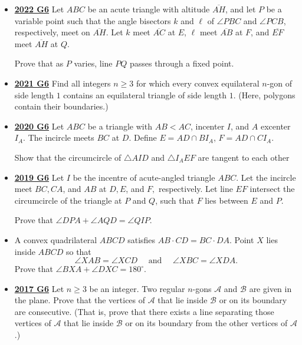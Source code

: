 \documentclass[11pt]{scrartcl}
\begin{document}
\begin{itemize}[leftmargin=*]
\item  \href{https://artofproblemsolving.com/community/c6h3107320p28104233}{\textbf{2022 G6}} Let $ABC$ be an acute triangle with altitude $\overline{AH}$, and let $P$ be a variable point such that the angle bisectors $k$ and $\ell$ of $\angle PBC$ and $\angle PCB$, respectively, meet on $\overline{AH}$. Let $k$ meet $\overline{AC}$ at $E$, $\ell$ meet $\overline{AB}$ at $F$, and $\overline{EF}$ meet $\overline{AH}$ at $Q$. 
    
Prove that as $P$ varies, line $PQ$ passes through a fixed point.
\item \href{https://artofproblemsolving.com/community/c6h2882534p25627484}{\textbf{2021 G6}} Find all integers $n\geqslant  3$ for which every convex equilateral $n$-gon of side length $1$ contains an equilateral triangle of side length $1$. (Here, polygons contain their boundaries.)
\item \href{https://artofproblemsolving.com/community/c6h2625869p22698132}{\textbf{2020 G6}} Let $ABC$ be a triangle with $AB < AC$, incenter $I$, and $A$ excenter $I_{A}$. The incircle meets $BC$ at $D$. Define $E = AD\cap BI_{A}$, $F = AD\cap CI_{A}$. 

Show that the circumcircle of $\triangle AID$ and $\triangle I_{A}EF$ are tangent to each other
\item \href{https://artofproblemsolving.com/community/c6h2279013p17828908}{\textbf{2019 G6}} Let $I$ be the incentre of acute-angled triangle $ABC$. Let the incircle meet $BC, CA$, and $AB$ at $D, E$, and $F,$ respectively. Let line $EF$ intersect the circumcircle of the triangle at $P$ and $Q$, such that $F$ lies between $E$ and $P$. 

Prove that $\angle DPA + \angle AQD =\angle QIP$.
\item {}  A convex quadrilateral $ABCD$ satisfies $AB\cdot CD = BC\cdot DA$. Point $X$ lies inside $ABCD$ so that\[\angle{XAB} = \angle{XCD}\quad\,\,\text{and}\quad\,\,\angle{XBC} = \angle{XDA}.\]Prove that $\angle{BXA} + \angle{DXC} = 180^\circ$.
\item \href{https://artofproblemsolving.com/community/c6h1671314p10632474}{\textbf{2017 G6}} Let $n\geqslant 3$ be an integer. Two regular $n$-gons $\mathcal{A}$ and $\mathcal{B}$ are given in the plane. Prove that the vertices of $\mathcal{A}$ that lie inside $\mathcal{B}$ or on its boundary are consecutive. (That is, prove that there exists a line separating those vertices of $\mathcal{A}$ that lie inside $\mathcal{B}$ or on its boundary from the other vertices of $\mathcal{A}$.)




\end{itemize}
\end{document}
